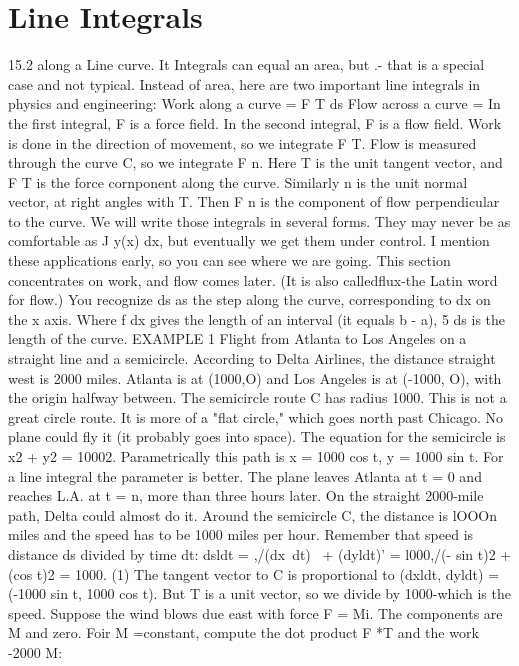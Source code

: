 \section{Line Integrals}\label{sec:line_integrals}
15.2
along a
Line
curve. It
Integrals
can equal an area, but
.-
that is a special
case and not typical. Instead of area, here are two important line integrals in physics
and engineering:
Work along a curve = F T ds Flow across a curve =
In the first integral, F is a force field. In the second integral, F is a flow field. Work
is done in the direction of movement, so we integrate F T. Flow is measured through
the curve C, so we integrate F n. Here T is the unit tangent vector, and F T is the
force cornponent along the curve. Similarly n is the unit normal vector, at right angles
with T. Then F n is the component of flow perpendicular to the curve.
We will write those integrals in several forms. They may never be as comfortable
as J y(x) dx, but eventually we get them under control. I mention these applications
early, so you can see where we are going. This section concentrates on work, and
flow comes later. (It is also calledflux-the Latin word for flow.) You recognize ds
as the step along the curve, corresponding to dx on the x axis. Where f dx gives the
length of an interval (it equals b - a), 5 ds is the length of the curve.
EXAMPLE 1 Flight from Atlanta to Los Angeles on a straight line and a semicircle.
According to Delta Airlines, the distance straight west is 2000 miles. Atlanta is at
(1000,O) and Los Angeles is at (-1000, O), with the origin halfway between. The
semicircle route C has radius 1000. This is not a great circle route. It is more of a
"flat circle," which goes north past Chicago. No plane could fly it (it probably goes
into space).
The equation for the semicircle is x2 + y2 = 10002. Parametrically this path is x =
1000 cos t, y = 1000 sin t. For a line integral the parameter is better. The plane leaves
Atlanta at t = 0 and reaches L.A. at t = n, more than three hours later. On the straight
2000-mile path, Delta could almost do it. Around the semicircle C, the distance is
lOOOn miles and the speed has to be 1000 miles per hour. Remember that speed is
distance ds divided by time dt:
dsldt = ,/(dx~dt)~ + (dyldt)' = l000,/(- sin t)2 + (cos t)2 = 1000. (1)
The tangent vector to C is proportional to (dxldt, dyldt) = (-1000 sin t, 1000 cos t).
But T is a unit vector, so we divide by 1000-which is the speed.
Suppose the wind blows due east with force F = Mi. The components are M and
zero. Foir M =constant, compute the dot product F *T and the work -2000 M:
